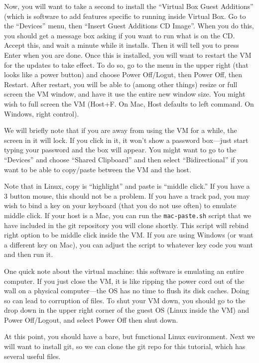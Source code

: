 \documentclass[12pt]{article}
\begin{document}
Now, you will want to take a second to install the ``Virtual Box Guest
Additions'' (which is software to add features specific to running
inside Virtual Box.  Go to the ``Devices'' menu, then ``Insert Guest
Additions CD Image''.  When you do this, you should get a message box
asking if you want to run what is on the CD.  Accept this, and wait a
minute while it installs.  Then it will tell you to press Enter when
you are done.  Once this is installed, you will want to restart the VM
for the updates to take effect. To do so, go to the menu in the upper
right (that looks like a power button) and choose Power Off/Logut,
then Power Off, then Restart. After restart, you will be able to (among
other things) resize or full screen the VM window, and have it use the
entire new window size.  You might wish to full screen the VM (Host+F.
On Mac, Host defaults to left command.  On Windows, right control).


We will briefly note that if you are away from using the VM for a
while, the screen in it will lock.  If you click in it, it won't show
a password box---just start typing your password and the box will
appear.  You might want to go to the ``Devices'' and choose ``Shared
Clipboard'' and then select ``Bidirectional'' if you want to be able
to copy/paste between the VM and the host.

Note that in Linux, copy is ``highlight'' and paste is ``middle click.''
If you have a 3 button mouse, this should not be a problem.  If you have
a track pad, you may wish to bind a key on your keyboard (that you do not
use often) to emulate middle click.  If your host is a Mac,
you can run the  \verb+mac-paste.sh+ script that we have included
in the git repository you will clone shortly.  This script will rebind right option
to be middle click inside the VM.  If you are using Windows (or want
a different key on Mac), you can adjust the script to whatever key code you want
and then run it.

One quick note about the virtual machine: this software is emulating
an entire computer.   If you just close the VM, it is like ripping the power
cord out of the wall on a physical computer---the OS has no time
to flush its disk caches.  Doing so can lead to corruption of files.
To shut your VM down, you should go to the drop down in the upper right corner
of the guest OS (Linux inside the VM) and Power Off/Logout, and select
Power Off then shut down.

At this point, you should have a bare, but functional Linux environment.
Next we will want to install git, so we can clone the git repo for this
tutorial, which has several useful files.
\end{document}
